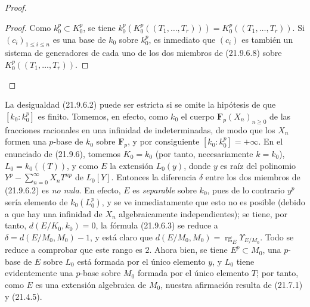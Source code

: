 \begin{proof}
\begin{enumerate}
  \begin{proof}
  Como $k_0^p\subset K_0^p$, se tiene
  $k_0^p(K_0^p((T_1,\ldots,T_r)))=K_0^p((T_1,\ldots,T_r))$.
  Si $(c_i)_{1\leqslant i\leqslant n}$ es una base de $k_0$ sobre $k_0^p$,
  es inmediato que $(c_i)$ es también un sistema de generadores de cada uno
  de los dos miembros de (21.9.6.8) sobre
  $K_0^p((T_1,\ldots,T_r))$.
  \end{proof}
\end{enumerate}
\end{proof}

\begin{remark}[21.9.7]
\label{0.21.9.7-fr}
La desigualdad (21.9.6.2) puede ser estricta si se omite la hipótesis de que
$[k_0:k_0^p]$ es finito. Tomemos, en efecto, como $k_0$ el cuerpo
$\mathbf F_p(X_n)_{n\geqslant0}$ de las fracciones racionales en una infinidad
de indeterminadas, de modo que los $X_n$ formen una $p$-base de $k_0$ sobre
$\mathbf F_p$, y por consiguiente $[k_0:k_0^p]=+\infty$. En el enunciado de
(21.9.6), tomemos $K_0=k_0$ (por tanto, necesariamente $k=k_0$),
$L_0=k_0((T))$, y como $E$ la extensión $L_0(y)$, donde $y$ es raíz del
polinomio
$Y^p-\sum_{n=0}^{\infty}X_nT^{np}$
de $L_0[Y]$. Entonces la diferencia $\delta$ entre los dos miembros de
(21.9.6.2) es \emph{no nula}. En efecto, $E$ es \emph{separable} sobre $k_0$,
pues de lo contrario $y^p$ sería elemento de $k_0(L_0^p)$, y se ve
inmediatamente que esto no es posible (debido a que hay una infinidad de
$X_n$ algebraicamente independientes); se tiene, por tanto,
$d(E/K_0,k_0)=0$, la fórmula (21.9.6.3) se reduce a
$\delta=d(E/M_0,M_0)-1$, y está claro que
$d(E/M_0,M_0)=\operatorname{rg}_E\Upsilon_{E/M_0}$. Todo se reduce a comprobar
que este rango es $2$. Ahora bien, se tiene $E^p\subset M_0$, una $p$-base de
$E$ sobre $L_0$ está formada por el único elemento $y$, y $L_0$ tiene
evidentemente una $p$-base sobre $M_0$ formada por el único elemento $T$; por
tanto, como $E$ es una extensión algebraica de $M_0$, nuestra afirmación
resulta de (21.7.1) y (21.4.5).
\end{remark}

